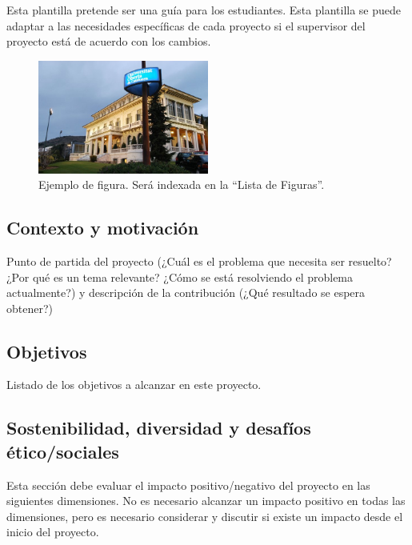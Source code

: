 Esta plantilla pretende ser una guía para los estudiantes. Esta plantilla se puede adaptar a las necesidades específicas de cada proyecto si el supervisor del proyecto está de acuerdo con los cambios.

\begin{figure}[h]
\centering
\includegraphics[width=0.5\textwidth]{./figs/image1.png}
\caption{Ejemplo de figura. Será indexada en la “Lista de Figuras”.}
\label{fig:figura_ejemplo}
\end{figure}

\subsection{Contexto y motivación}

Punto de partida del proyecto (¿Cuál es el problema que necesita ser resuelto? ¿Por qué es un tema relevante? ¿Cómo se está resolviendo el problema actualmente?) y descripción de la contribución (¿Qué resultado se espera obtener?)

\subsection{Objetivos}

Listado de los objetivos a alcanzar en este proyecto.

\subsection{Sostenibilidad, diversidad y desafíos ético/sociales}

Esta sección debe evaluar el impacto positivo/negativo del proyecto en las siguientes dimensiones. No es necesario alcanzar un impacto positivo en todas las dimensiones, pero es necesario considerar y discutir si existe un impacto desde el inicio del proyecto.

